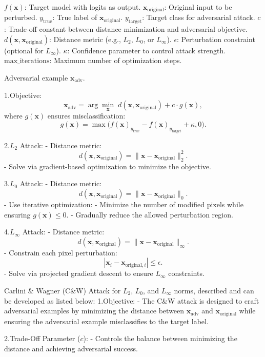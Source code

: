 $f(\mathbf{x})$: Target model with logits as output.
$\mathbf{x}_{\text{original}}$: Original input to be perturbed.
$y_{\text{true}}$: True label of $\mathbf{x}_{\text{original}}$.
$y_{\text{target}}$: Target class for adversarial attack.
$c$: Trade-off constant between distance minimization and adversarial objective.
$d(\mathbf{x}, \mathbf{x}_{\text{original}})$: Distance metric (e.g., $L_2$, $L_0$, or $L_\infty$).
$\epsilon$: Perturbation constraint (optional for $L_\infty$).
$\kappa$: Confidence parameter to control attack strength.
$\text{max\_iterations}$: Maximum number of optimization steps.

Adversarial example $\mathbf{x}_{\text{adv}}$.

1.Objective:
   \[
   \mathbf{x}_{\text{adv}} = \arg \min_{\mathbf{x}} \; d(\mathbf{x}, \mathbf{x}_{\text{original}}) + c \cdot g(\mathbf{x}),
   \]
   where $g(\mathbf{x})$ ensures misclassification:
   \[
   g(\mathbf{x}) = \max \big( f(\mathbf{x})_{y_{\text{true}}} - f(\mathbf{x})_{y_{\text{target}}} + \kappa, 0 \big).
   \]

2.$L_2$ Attack:
   - Distance metric:
     \[
     d(\mathbf{x}, \mathbf{x}_{\text{original}}) = \|\mathbf{x} - \mathbf{x}_{\text{original}}\|_2^2.
     \]
   - Solve via gradient-based optimization to minimize the objective.

3.$L_0$ Attack:
   - Distance metric:
     \[
     d(\mathbf{x}, \mathbf{x}_{\text{original}}) = \|\mathbf{x} - \mathbf{x}_{\text{original}}\|_0.
     \]
   - Use iterative optimization:
     - Minimize the number of modified pixels while ensuring $g(\mathbf{x}) \leq 0$.
     - Gradually reduce the allowed perturbation region.

4.$L_\infty$ Attack:
   - Distance metric:
     \[
     d(\mathbf{x}, \mathbf{x}_{\text{original}}) = \|\mathbf{x} - \mathbf{x}_{\text{original}}\|_\infty.
     \]
   - Constrain each pixel perturbation:
     \[
     |\mathbf{x}_i - \mathbf{x}_{\text{original}, i}| \leq \epsilon.
     \]
   - Solve via projected gradient descent to ensure $L_\infty$ constraints.

Carlini & Wagner (C&W) Attack for $L_2$, $L_0$, and $L_\infty$ norms, described and can be developed as listed below:
1.Objective:
   - The C\&W attack is designed to craft adversarial examples by minimizing the distance between $\mathbf{x}_{\text{adv}}$ and $\mathbf{x}_{\text{original}}$ while ensuring the adversarial example misclassifies to the target label.

2.Trade-Off Parameter ($c$):
   - Controls the balance between minimizing the distance and achieving adversarial success.

